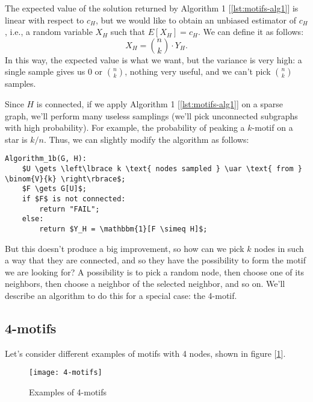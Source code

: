 \begin{obs}
    The expected value of the solution returned by Algorithm 1 [\ref{lst:motifs-alg1}] is linear with respect to $c_H$, but we would like to obtain an unbiased estimator of $c_H$, i.e., a random variable $X_H$ such that $E[X_H] = c_H$. We can define it as follows:
    \begin{equation}\label{eq:exh-1}
        X_H = \binom{n}{k} \cdot Y_H.
    \end{equation}
    In this way, the expected value is what we want, but the variance is very high: a single sample gives us 0 or $\binom{n}{k}$, nothing very useful, and we can't pick $\binom{n}{k}$ samples.
\end{obs}

\begin{obs}
    Since $H$ is connected, if we apply Algorithm 1 [\ref{lst:motifs-alg1}] on a sparse graph, we'll perform many useless samplings (we'll pick unconnected subgraphs with high probability). For example, the probability of peaking a $k$-motif on a star is $k/n$. Thus, we can slightly modify the algorithm as follows:
    \begin{lstlisting}[caption={Algorithm 1b}, label={lst:motifs-alg1b}]
Algorithm_1b(G, H):
    $U \gets \left\lbrace k \text{ nodes sampled } \uar \text{ from } \binom{V}{k} \right\rbrace$;
    $F \gets G[U]$;
    if $F$ is not connected:
        return "FAIL";
    else:
        return $Y_H = \mathbbm{1}[F \simeq H]$;
    \end{lstlisting}
    But this doesn't produce a big improvement, so how can we pick $k$ nodes in such a way that they are connected, and so they have the possibility to form the motif we are looking for? A possibility is to pick a random node, then choose one of its neighbors, then choose a neighbor of the selected neighbor, and so on. We'll describe an algorithm to do this for a special case: the 4-motif.
\end{obs}


\subsection{4-motifs}\label{sec:4-motifs}

Let's consider different examples of motifs with 4 nodes, shown in figure [\ref{fig:4-motifs}].

\begin{figure}[h!]
    \centering
    \texttt{[image: 4-motifs]}
    \caption{Examples of 4-motifs}
    \label{fig:4-motifs}
\end{figure}

